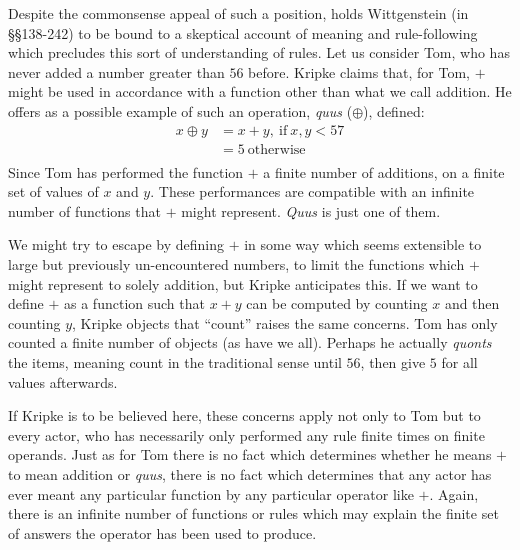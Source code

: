 \documentclass[man,12pt,natbib]{apa6}
\begin{document}
Despite the commonsense appeal of such a position, \citet{Kripke82} holds
Wittgenstein (in \S\S 138-242) to be bound to a skeptical account of meaning and
rule-following which precludes this sort of understanding of rules. Let us
consider Tom, who has never added a number greater than $56$ before. Kripke
claims that, for Tom, $+$ might be used in accordance with a function other
than what we call addition. He offers as a possible example of such an
operation, \emph{quus} ($\oplus$), defined:
\begin{equation}
\begin{aligned}
	x \oplus y &= x + y,~\mathrm{if}~x,y <57\\
	& = 5~\mathrm{otherwise} \\
\end{aligned}
\end{equation}
Since Tom has performed the function $+$ a finite number of additions, on a
finite set of values of $x$ and $y$. These performances are compatible with an
infinite number of functions that $+$ might represent. \emph{Quus} is just one
of them.

We might try to escape by defining $+$ in some way which seems extensible to
large but previously un-encountered numbers, to limit the functions which $+$
might represent to solely addition, but Kripke anticipates this. If we want to
define $+$ as a function such that $x + y$ can be computed by counting $x$ and
then counting $y$, Kripke objects that	``count'' raises the same concerns. Tom
has only counted a finite number of objects (as have we all). Perhaps he
actually \emph{quonts} the items, meaning count in the traditional sense until
$56$, then give $5$ for all values afterwards.

If Kripke is to be believed here, these concerns apply not only to Tom but to
every actor, who has necessarily only performed any rule finite times on finite
operands. Just as for Tom there is no fact which determines whether he means
$+$ to mean addition or \emph{quus}, there is no fact which determines that any
actor has ever meant any particular function by any particular operator like
$+$. Again, there is an infinite number of functions or rules which may explain
the finite set of answers the operator has been used to produce.
\end{document}

